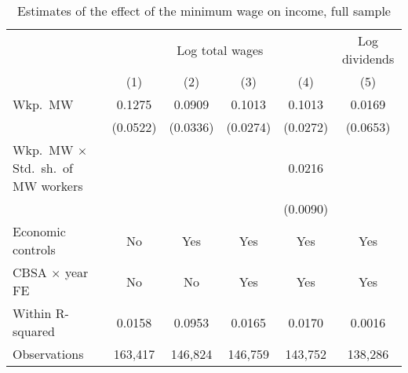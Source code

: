 \begin{table}[hbt!]
    \centering
    \caption{Estimates of the effect of the minimum wage on income, full sample}
    \label{tab:static_wages}

    \begin{tabular}{@{}lccccc@{}}
        \toprule
                                & \multicolumn{4}{c}{Log total wages}
                                & \multicolumn{1}{c}{Log dividends}                        \\ \cmidrule(lr){2-5}\cmidrule(lr){6-6}
                                & (1)       & (2)      & (3)      & (4)       & (5)        \\ \midrule
        Wkp.\ MW            & 0.1275       & 0.0909      & 0.1013      & 0.1013       & 0.0169        \\
                                & (0.0522)     & (0.0336)    & (0.0274)    & (0.0272)     & (0.0653)      \\
        Wkp.\ MW $\times$ Std.\ 
            sh.\ of MW workers &           &          &          & 0.0216       &            \\
                                &           &          &          & (0.0090)     &            \\ \midrule
        Economic controls       & No        & Yes      & Yes      & Yes       & Yes        \\
        CBSA $\times$ year FE   & No        & No       & Yes      & Yes       & Yes        \\
        Within R-squared        & 0.0158       & 0.0953      & 0.0165      & 0.0170       & 0.0016        \\
        Observations            & 163,417      & 146,824     & 146,759     & 143,752      & 138,286       \\ \bottomrule
    \end{tabular}


\end{table}
